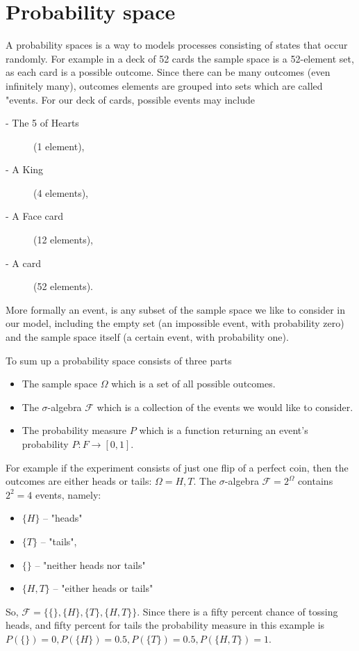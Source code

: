\section{Probability space}
A probability spaces is a way to models processes consisting of states that occur randomly. For example in a deck of 52 cards the sample space is a 52-element set, as each card is a possible outcome. Since there can be many outcomes (even infinitely many), outcomes elements are grouped into sets which are called "events. For our deck of cards, possible events may include
\begin{description}
\item [- The 5 of Hearts] (1 element),
\item [- A King] (4 elements),
\item [- A Face card] (12 elements),
\item [- A card] (52 elements).
\end{description}
More formally an event, is any subset of the sample space we like to consider in our model, including the empty set (an impossible event, with probability zero) and the sample space itself (a certain event, with probability one).

\noindent To sum up a probability space consists of three parts
\begin{itemize}
\item The sample space $\Omega$ which is a set of all possible outcomes.
\item The $\sigma$-algebra $\mathcal{F}$ which is a collection of the events we would like to consider.
\item The probability measure $P$ which is a function returning an event's probability $P: F \rightarrow [0,1]$.
\end{itemize}

For example if the experiment consists of just one flip of a perfect coin, then the outcomes are either heads or tails: $\Omega = {H, T}$. The $\sigma$-algebra $\mathcal{F} = 2^{\Omega}$ contains $2^2 = 4$ events, namely:
\begin{itemize}
\item $\{H\}$ – "heads"
\item $\{T\}$ – "tails",
\item $\{\}$ – "neither heads nor tails"
\item $\{H,T\}$ – "either heads or tails"
\end{itemize}
So, $\mathcal{F} = \{\{\}, \{H\}, \{T\}, \{H,T\}\}$. Since there is a fifty percent chance of tossing heads, and fifty percent for tails the probability measure in this example is $P(\{\}) = 0, P(\{H\}) = 0.5, P(\{T\}) = 0.5, P(\{H,T\}) = 1$.

